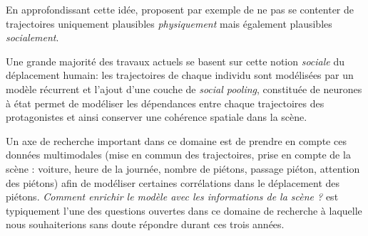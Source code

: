 En approfondissant cette idée, \cite{2018arXiv180310892G} proposent par exemple de ne pas se contenter de trajectoires uniquement plausibles \textit{physiquement} mais également plausibles \textit{socialement}. 

Une grande majorité des travaux actuels \cite{alahi2016social,lee2017desire,2018arXiv180310892G} se basent sur cette notion \textit{sociale} du déplacement humain: les trajectoires de chaque individu sont modélisées par un modèle récurrent et l'ajout d'une couche de \textit{social pooling}, constituée de neurones à état permet de modéliser les dépendances entre chaque trajectoires des protagonistes et ainsi conserver une cohérence spatiale dans la scène.

Un axe de recherche important dans ce domaine est de prendre en compte ces données multimodales (mise en commun des trajectoires, prise en compte de la scène : voiture, heure de la journée, nombre de piétons, passage piéton, attention des piétons) afin de modéliser certaines corrélations dans le déplacement des piétons. \textit{Comment enrichir le modèle avec les informations de la scène ?} est typiquement l'une des questions ouvertes dans ce domaine de recherche à laquelle nous souhaiterions sans doute répondre durant ces trois années.